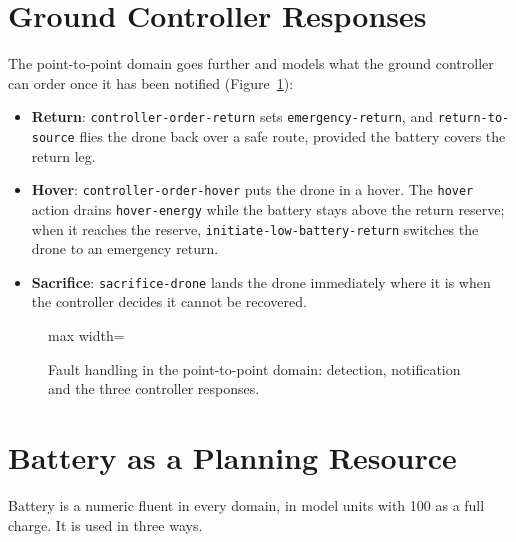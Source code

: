 \documentclass[11pt,a4paper,oneside]{report}
\newcommand{\code}[1]{\texttt{#1}}
\begin{document}
\section{Ground Controller Responses}
The point-to-point domain goes further and models what the ground controller can order once it
has been notified (Figure~\ref{fig:faultflow}):
\begin{itemize}
  \item \textbf{Return}: \code{controller-order-return} sets \code{emergency-return}, and
        \code{return-to-source} flies the drone back over a safe route, provided the battery
        covers the return leg.
  \item \textbf{Hover}: \code{controller-order-hover} puts the drone in a hover. The \code{hover}
        action drains \code{hover-energy} while the battery stays above the return reserve; when
        it reaches the reserve, \code{initiate-low-battery-return} switches the drone to an
        emergency return.
  \item \textbf{Sacrifice}: \code{sacrifice-drone} lands the drone immediately where it is when the
        controller decides it cannot be recovered.
\end{itemize}

\begin{figure}[H]
\centering
\begin{adjustbox}{max width=\linewidth}
\end{adjustbox}
\caption[Fault response sequence]{Fault handling in the point-to-point domain: detection, notification and the three
controller responses.}
\label{fig:faultflow}
\end{figure}

\section{Battery as a Planning Resource}
Battery is a numeric fluent in every domain, in model units with 100 as a full charge. It is used
in three ways.
\end{document}
